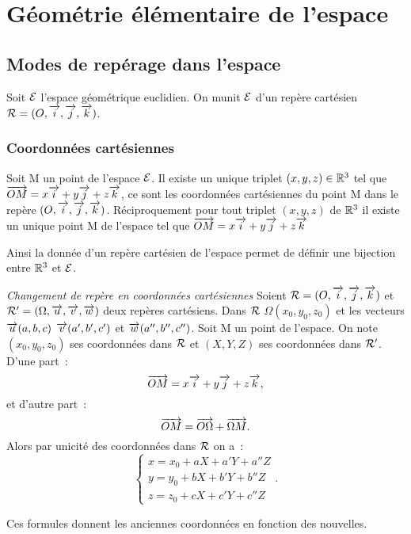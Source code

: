 \chapter{Géométrie élémentaire de l'espace}
\label{chap:geomEspace}
\minitoc
\minilof
\minilot
\section{Modes de repérage dans l'espace}
Soit \(\mathcal{E}\) l'espace géométrique euclidien. On munit \(\mathcal{E}\) d'un repère cartésien \(\mathcal{R}=(O,\overrightarrow{i},\overrightarrow{j},\overrightarrow{k})\).

\subsection{Coordonnées cartésiennes}
\begin{defdef}
  Soit M un point de l'espace \(\mathcal{E}\). Il existe un unique triplet \((x,y,z)\in\mathbb{R}^3\) tel que \(\overrightarrow{OM}=x\overrightarrow{i}+y\overrightarrow{j}+z\overrightarrow{k}\), ce sont les coordonnées cartésiennes du point M dans le repère \((O,\overrightarrow{i},\overrightarrow{j},\overrightarrow{k})\). Réciproquement pour tout triplet \((x,y,z)\) de \(\mathbb{R}^3\) il existe un unique point M de l'espace tel que \(\overrightarrow{OM}=x\overrightarrow{i}+y\overrightarrow{j}+z\overrightarrow{k}\)
\end{defdef}
Ainsi la donnée d'un repère cartésien de l'espace permet de définir une bijection entre \(\mathbb{R}^3\) et \(\mathcal{E}\).

\emph{Changement de repère en coordonnées cartésiennes}
Soient \(\mathcal{R}=(O,\overrightarrow{i},\overrightarrow{j},\overrightarrow{k})\) et \(\mathcal{R}'=(\Omega,\overrightarrow{u},\overrightarrow{v},\overrightarrow{w})\) deux repères cartésiens. Dans \(\mathcal{R}\) \(\Omega(x_0,y_0,z_0)\) et les vecteurs \(\overrightarrow{u}(a,b,c)\) \(\overrightarrow{v}(a',b',c')\) et \(\overrightarrow{w}(a'',b'',c'')\). Soit M un point de l'espace. On note \((x_0,y_0,z_0)\) ses coordonnées dans \(\mathcal{R}\) et \((X,Y,Z)\) ses coordonnées dans \(\mathcal{R}'\). D'une part~:
\begin{equation}
  \overrightarrow{OM}=x\overrightarrow{i}+y\overrightarrow{j}+z\overrightarrow{k},
\end{equation}
et d'autre part~:
\begin{equation}
  \overrightarrow{OM}=\overrightarrow{O\Omega}+\overrightarrow{\Omega M}.
\end{equation}
Alors par unicité des coordonnées dans \(\mathcal{R}\) on a~:
\begin{equation}
  \begin{cases}
    x=x_0+aX+a'Y+a''Z\\
    y=y_0+bX+b'Y+b''Z\\
    z=z_0+cX+c'Y+c''Z
  \end{cases}.
\end{equation}

\danger Ces formules donnent les \og{}anciennes\fg{} coordonnées en fonction des \og{}nouvelles\fg{}.

